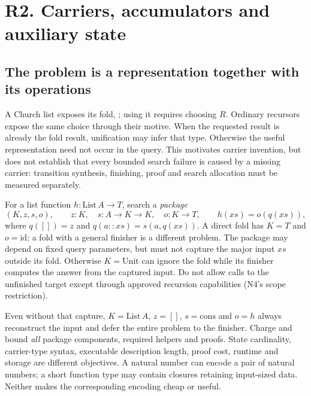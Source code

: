 \section{R2. Carriers, accumulators and auxiliary state}\label{sec:carriers}

\subsection{The problem is a representation together with its operations}
\label{sec:carrier-package}

A Church list exposes its fold,
; using it requires choosing
$R$. Ordinary recursors expose the same choice through their motive. When the
requested result is already the fold result, unification may infer that type.
Otherwise the useful representation need not occur in the query. This motivates
carrier invention, but does not establish that every bounded search failure is
caused by a missing carrier: transition synthesis, finishing, proof and search
allocation must be measured separately.

For a list function $h:\mathrm{List}\,A\to T$, search a \emph{package}
\begin{equation}\label{eq:carrier-package}
 (K,z,s,o),\qquad z:K,\quad s:A\to K\to K,\quad o:K\to T,
 \qquad h(xs)=o(q(xs)),
\end{equation}
where $q([])=z$ and $q(a::xs)=s(a,q(xs))$. A direct fold has $K=T$ and
$o=\mathrm{id}$; a fold with a general finisher is a different problem.
The package may depend on fixed query parameters, but must not capture the
major input $xs$ outside its fold. Otherwise $K=\mathrm{Unit}$ can ignore the
fold while its finisher computes the answer from the captured input. Do not
allow calls to the unfinished target except through approved recursion
capabilities (N4's scope restriction).

Even without that capture, $K=\mathrm{List}\,A$, $z=[]$, $s=\mathrm{cons}$
and $o=h$ always reconstruct the input and defer the entire problem to the
finisher. Charge and bound \emph{all} package components, required helpers and
proofs. State cardinality, carrier-type syntax, executable description length,
proof cost, runtime and storage are different objectives. A natural number
can encode a pair of natural numbers; a short function type may contain
closures retaining input-sized data. Neither makes the corresponding encoding
cheap or useful.

